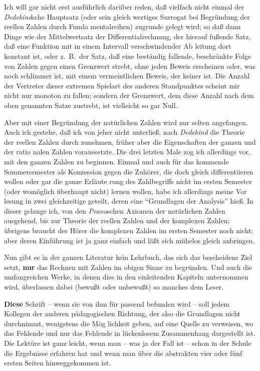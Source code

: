 Ich will gar nicht erst ausf\"uhrlich dar\"uber reden, da{\ss} vielfach
nicht einmal der {\sl Dedekind\/}sche Hauptsatz (oder sein gleich%
wertiges Surrogat bei Begr\"undung der reellen Zahlen durch Funda%
mentalreihen) zugrunde gelegt wird; so da{\ss} dann Dinge wie der
Mittelwertsatz der Differentialrechnung, der hierauf fu{\ss}ende Satz,
da{\ss} eine Funktion mit in einem Intervall verschwindender Ab%
leitung dort konstant ist, oder z.~B.\ der Satz, da{\ss} eine best\"andig
fallende, beschr\"ankte Folge von Zahlen gegen einen Grenzwert
strebt, ohne jeden Beweis erscheinen oder, was noch schlimmer ist,
mit einem vermeintlichen Beweis, der keiner ist.  Die Anzahl der
Vertreter dieser extremen Spielart des anderen Standpunktes scheint
mir nicht nur monoton zu fallen; sondern der Grenzwert, dem diese
Anzahl nach dem oben genannten Satze zustrebt, ist vielleicht so%
gar Null.

Aber mit einer Begr\"undung der nat\"urlichen Zahlen wird nur
selten angefangen.  Auch ich gestehe, da{\ss} ich von jeher nicht
unterlie{\ss}, nach {\sl Dedekind\/} die Theorie der reellen Zahlen durch%
zunehmen, fr\"uher aber die Eigenschaften der ganzen und der ratio%
nalen Zahlen voraussetzte.  Die drei letzten Male zog ich allerdings
vor, mit den ganzen Zahlen zu beginnen.  Einmal und auch f\"ur
das kommende Sommersemester als Konzession gegen die Zuh\"orer,
die doch gleich differentiieren wollen oder gar die ganze Erl\"aute%
rung des Zahlbegriffs nicht im ersten Semester (oder wom\"oglich
\"uberhaupt nicht) lernen wollen, habe ich allerdings meine Vor%
lesung in zwei gleichzeitige geteilt, deren eine ``Grundlagen der
Analysis'' hie{\ss}.  In dieser gelange ich, von den {\sl Peano\/}schen
Axiomen der nat\"urlichen Zahlen ausgehend, bis zur Theorie der
reellen Zahlen und der komplexen Zahlen; \"ubrigens braucht der
H\"orer die komplexen Zahlen im ersten Semester noch nicht; aber
deren Einf\"uhrung ist ja ganz einfach und l\"a{\ss}t sich m\"uhelos gleich
anbringen.

Nun gibt es in der ganzen Literatur kein Lehrbuch, das sich
das bescheidene Ziel setzt, {\bf nur} das Rechnen mit Zahlen im obigen
Sinne zu begr\"unden.  Und auch die umfangreichen Werke, in denen
dies in den einleitenden Kapiteln unternommen wird, \"uberlassen
dabei (bewu{\ss}t oder unbewu{\ss}t) so manches dem Leser.

{\bf Diese} Schrift -- wenn sie von ihm f\"ur passend befunden
wird -- soll jedem Kollegen der anderen p\"adagogischen Richtung,
der also die Grundlagen nicht durchnimmt, wenigstens die M\"og%
lichkeit geben, auf eine Quelle zu verweisen, wo das Fehlende und
nur das Fehlende in l\"uckenlosem Zusammenhang dargestellt ist.
Die Lekt\"ure ist ganz leicht, wenn man -- was ja der Fall ist --
schon in der Schule die Ergebnisse erfahren hat und wenn man
\"uber die abstrakten vier oder f\"unf ersten Seiten hinweggekommen ist.

